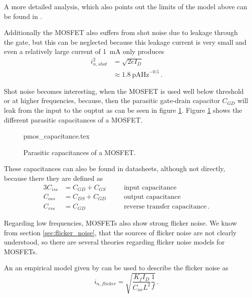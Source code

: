 \documentclass[12pt]{book}
\begin{document}
A more detailed analysis, which also points out the limits of the model above can be found in \cite{mosfet_thermal_noise_details}.

Additionally the MOSFET also suffers from shot noise due to leakage through the gate, but this can be neglected because this leakage current is very small and even a relatively large current of \qty{1}{\mA} only produces
\begin{align}
    i_{n,shot}^2 &= \sqrt{2 e I_D}\\
    &\approx \qty[power-half-as-sqrt, per-mode=symbol]{1.8}{\pA \Hz \tothe{-0.5}} \,.
\end{align}

Shot noise becomes interesting, when the MOSFET is used well below threshold or at higher frequencies, because, then the parasitic gate-drain capacitor $C_{GD}$ will leak from the input to the ouptut as can be seen in figure \ref{fig:mosfet_parasitic_capacitors}. Figure \ref{fig:mosfet_parasitic_capacitors} shows the different parasitic capacitances of a MOSFET.
\begin{figure}[hb]
    \centering
        {pmos_capacitance.tex}
    \caption{Parasitic capacitances of a MOSFET.}
    \label{fig:mosfet_parasitic_capacitors}
\end{figure}

These capacitances can also be found in datasheets, although not directly, because there they are defined as
\begin{alignat}{3}
    C_{iss} &= C_{GD} + C_{GS} &\quad&\text{input capacitance}\\
    C_{oss} &= C_{DS} + C_{GD} &\quad&\text{output capacitance}\\
    C_{rss} &= C_{GD} &\quad&\text{reverse transfer capacitance} \,.
\end{alignat}

Regarding low frequencies, MOSFETs also show strong flicker noise. We know from section \ref{sec:flicker_noise}, that the sources of flicker noise are not clearly understood, so there are several theories regarding flicker noise models for MOSFETs.

An an empirical model given by \cite{mosfet_noise_overview,mosfet_flicker_noise} can be used to describe the flicker noise as
\begin{equation}
    i_{n,flicker} = \sqrt{\frac{K_f I_D}{C_{ox} L^2} \frac{1}{f}}\,.
\end{equation}
\end{document}
